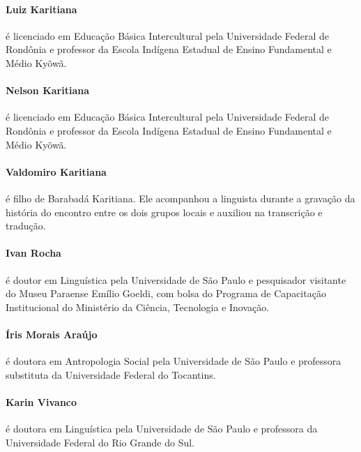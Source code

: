 \paragraph{Luiz Karitiana} é licenciado em Educação Básica Intercultural pela Universidade Federal de Rondônia e professor da Escola Indígena Estadual de Ensino Fundamental e Médio Kyõwã.
\vspace{-0.2cm}

\paragraph{Nelson Karitiana} é licenciado em Educação Básica Intercultural pela Universidade Federal de Rondônia e professor da Escola Indígena Estadual de Ensino Fundamental e Médio Kyõwã.
\vspace{-0.2cm}

\paragraph{Valdomiro Karitiana} é filho de Barabadá Karitiana. Ele acompanhou a linguista durante a gravação da história do encontro entre os dois grupos locais e auxiliou na transcrição e tradução.
\vspace{-0.2cm}

\paragraph{Ivan Rocha} é doutor em Linguística pela Universidade de São Paulo e pesquisador visitante do Museu Paraense Emílio Goeldi, com bolsa do Programa de Capacitação Institucional do Ministério da Ciência, Tecnologia e Inovação. 
\vspace{-0.2cm}

\paragraph{Íris Morais Araújo} é doutora em Antropologia Social pela Universidade de São Paulo e professora substituta da Universidade Federal do Tocantins.%
\vspace{-0.2cm}

\paragraph{Karin Vivanco} é doutora em Linguística pela Universidade de São Paulo e professora da Universidade Federal do Rio Grande do Sul.

